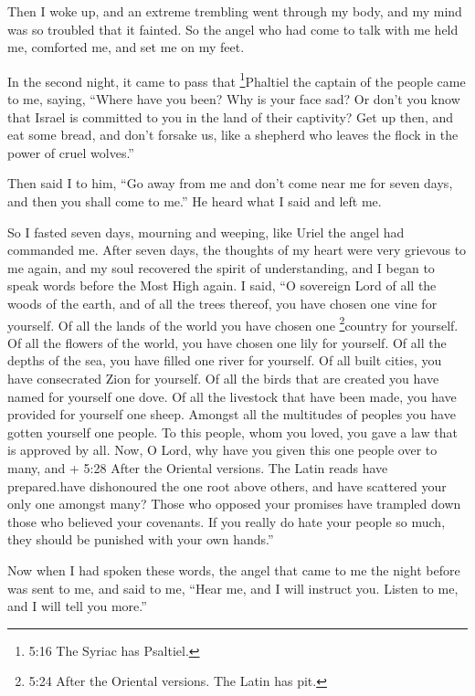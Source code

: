  Then I woke up, and an extreme trembling went through my
body, and my mind was so troubled that it fainted.  So the
angel who had come to talk with me held me, comforted me, and set me on
my feet.

 In the second night, it came to pass that
\footnote{5:16 The Syriac has Psaltiel.}Phaltiel the captain of the
people came to me, saying, ``Where have you been? Why is your face sad?
 Or don't you know that Israel is committed to you in the
land of their captivity?  Get up then, and eat some bread,
and don't forsake us, like a shepherd who leaves the flock in the power
of cruel wolves.''

 Then said I to him, ``Go away from me and don't come near
me for seven days, and then you shall come to me.'' He heard what I said
and left me.

 So I fasted seven days, mourning and weeping, like Uriel
the angel had commanded me.  After seven days, the thoughts
of my heart were very grievous to me again,  and my soul
recovered the spirit of understanding, and I began to speak words before
the Most High again.  I said, ``O sovereign Lord of all the
woods of the earth, and of all the trees thereof, you have chosen one
vine for yourself.  Of all the lands of the world you have
chosen one \footnote{5:24 After the Oriental versions. The Latin has
  pit.}country for yourself. Of all the flowers of the world, you have
chosen one lily for yourself.  Of all the depths of the
sea, you have filled one river for yourself. Of all built cities, you
have consecrated Zion for yourself.  Of all the birds that
are created you have named for yourself one dove. Of all the livestock
that have been made, you have provided for yourself one sheep.
 Amongst all the multitudes of peoples you have gotten
yourself one people. To this people, whom you loved, you gave a law that
is approved by all.  Now, O Lord, why have you given this
one people over to many, and + 5:28 After the Oriental versions. The
Latin reads have prepared.have dishonoured the one root above others,
and have scattered your only one amongst many?  Those who
opposed your promises have trampled down those who believed your
covenants.  If you really do hate your people so much, they
should be punished with your own hands.''

 Now when I had spoken these words, the angel that came to
me the night before was sent to me,  and said to me, ``Hear
me, and I will instruct you. Listen to me, and I will tell you more.''

